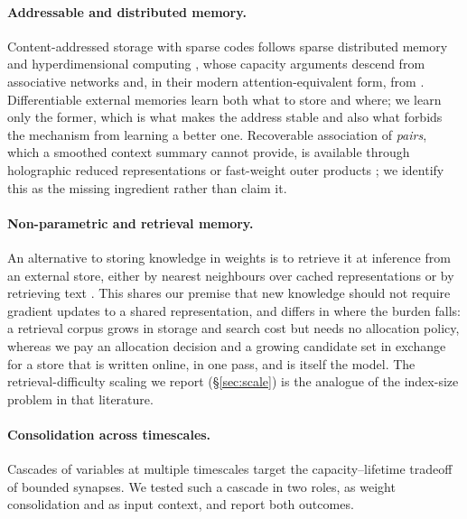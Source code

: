 \documentclass[11pt,a4paper]{article}
\begin{document}
\paragraph{Addressable and distributed memory.}
Content-addressed storage with sparse codes follows sparse distributed memory
\citep{kanerva1988sparse} and hyperdimensional computing
\citep{kanerva2009hyperdimensional}, whose capacity arguments descend from
associative networks \citep{hopfield1982neural} and, in their modern
attention-equivalent form, from \citet{ramsauer2021hopfield}. Differentiable
external memories \citep{weston2015memory,graves2016hybrid} learn both what to
store and where; we learn only the former, which is what makes the address
stable and also what forbids the mechanism from learning a better one.
Recoverable association of \emph{pairs}, which a smoothed context summary
cannot provide, is available through holographic reduced representations
\citep{plate1995holographic} or fast-weight outer products
\citep{schmidhuber1992learning,ba2016using,schlag2021linear}; we identify this
as the missing ingredient rather than claim it.

\paragraph{Non-parametric and retrieval memory.}
An alternative to storing knowledge in weights is to retrieve it at inference
from an external store, either by nearest neighbours over cached representations
\citep{khandelwal2020generalization} or by retrieving text
\citep{guu2020realm,lewis2020retrieval,borgeaud2022improving}. This shares our
premise that new knowledge should not require gradient updates to a shared
representation, and differs in where the burden falls: a retrieval corpus grows
in storage and search cost but needs no allocation policy, whereas we pay an
allocation decision and a growing candidate set in exchange for a store that is
written online, in one pass, and is itself the model. The retrieval-difficulty
scaling we report (\S\ref{sec:scale}) is the analogue of the index-size problem
in that literature.

\paragraph{Consolidation across timescales.}
Cascades of variables at multiple timescales
\citep{fusi2005cascade,benna2016computational} target the capacity--lifetime
tradeoff of bounded synapses. We tested such a cascade in two roles, as weight
consolidation and as input context, and report both outcomes.
\end{document}
